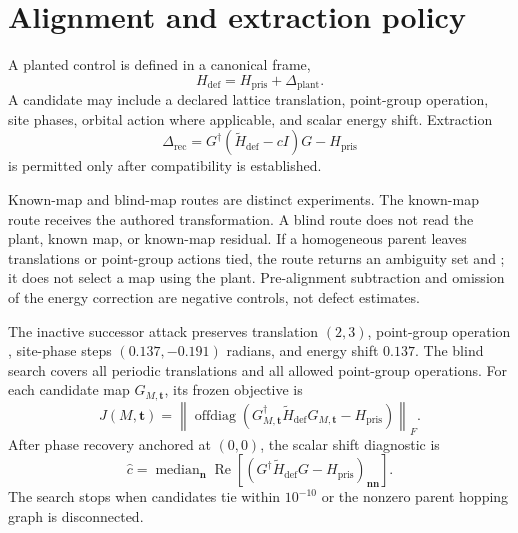 \documentclass[11pt]{article}
\begin{document}
\section{Alignment and extraction policy}

A planted control is defined in a canonical frame,
\begin{equation}
  H_{\mathrm{def}}=H_{\mathrm{pris}}+\Delta_{\mathrm{plant}}.
\end{equation}
A candidate may include a declared lattice translation, point-group operation, site
phases, orbital action where applicable, and scalar energy shift.  Extraction
\begin{equation}
  \Delta_{\mathrm{rec}}=
  G^\dagger(\widetilde H_{\mathrm{def}}-cI)G-H_{\mathrm{pris}}
\end{equation}
is permitted only after compatibility is established.

Known-map and blind-map routes are distinct experiments.  The known-map route receives
the authored transformation.  A blind route does not read the plant, known map, or
known-map residual.  If a homogeneous parent leaves translations or point-group actions
tied, the route returns an ambiguity set and
; it does not select a map using the plant.
Pre-alignment subtraction and omission of the energy correction are negative controls,
not defect estimates.

The inactive successor attack preserves translation $(2,3)$, point-group operation
, site-phase steps $(0.137,-0.191)$ radians, and
energy shift $0.137$.  The blind search covers all periodic translations and all allowed
point-group operations.  For each candidate map $G_{M,\mathbf t}$, its frozen objective
is
\begin{equation}
  J(M,\mathbf t)
  =\left\lVert
    \operatorname{offdiag}\!\left(
      G_{M,\mathbf t}^{\dagger}\widetilde H_{\mathrm{def}}G_{M,\mathbf t}
      -H_{\mathrm{pris}}
    \right)
  \right\rVert_F.
\end{equation}
After phase recovery anchored at $(0,0)$, the scalar shift diagnostic is
\begin{equation}
  \widehat c
  =\operatorname{median}_{\mathbf n}
    \operatorname{Re}\left[
      \left(
        G^{\dagger}\widetilde H_{\mathrm{def}}G-H_{\mathrm{pris}}
      \right)_{\mathbf n\mathbf n}
    \right].
\end{equation}
The search stops when candidates tie within $10^{-10}$ or the nonzero parent hopping
graph is disconnected.
\end{document}
